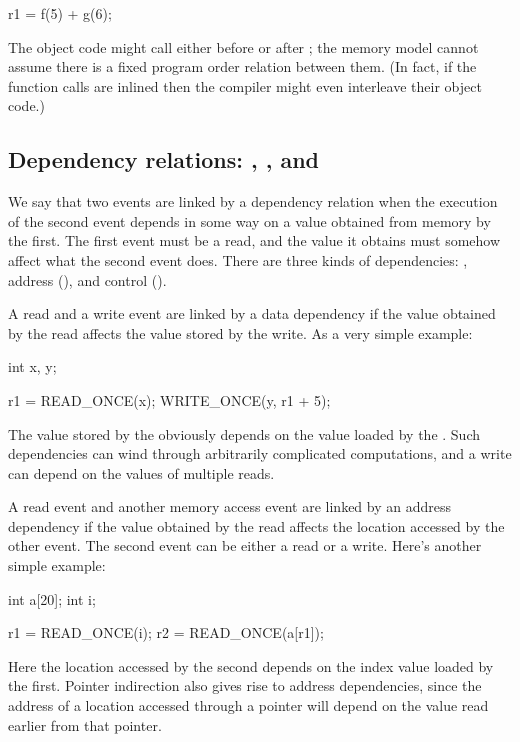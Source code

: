 \begin{VerbatimU}
	r1 = f(5) + g(6);
\end{VerbatimU}

The object code might call  either before or after ; the
memory model cannot assume there is a fixed program order relation
between them.
(In fact, if the function calls are inlined then the compiler might
even interleave their object code.)


\subsection{Dependency relations: , , and }
\label{sec:docs:explanation:Dependency Relations: data, addr, and ctrl}

We say that two events are linked by a dependency relation when the
execution of the second event depends in some way on a value obtained
from memory by the first.
The first event must be a read, and the value it obtains must somehow
affect what the second event does.
There are three kinds of dependencies: , address (),
and control ().

A read and a write event are linked by a data dependency if the value
obtained by the read affects the value stored by the write.
As a very simple example:

\begin{VerbatimU}
	int x, y;

	r1 = READ_ONCE(x);
	WRITE_ONCE(y, r1 + 5);
\end{VerbatimU}

The value stored by the  obviously depends on the value
loaded by the .
Such dependencies can wind through arbitrarily complicated
computations, and a write can depend on the values of multiple reads.

A read event and another memory access event are linked by an address
dependency if the value obtained by the read affects the location
accessed by the other event.
The second event can be either a read or a write.
Here's another simple example:

\begin{VerbatimU}
	int a[20];
	int i;

	r1 = READ_ONCE(i);
	r2 = READ_ONCE(a[r1]);
\end{VerbatimU}

Here the location accessed by the second  depends on the
index value loaded by the first.
Pointer indirection also gives rise to address dependencies, since
the address of a location accessed through a pointer will depend on
the value read earlier from that pointer.

